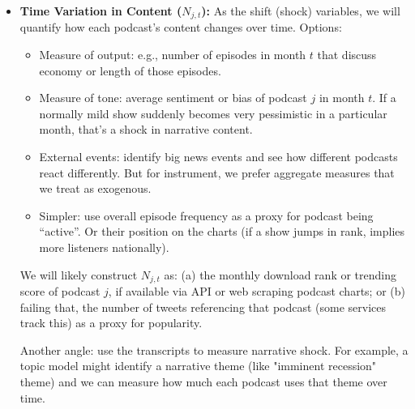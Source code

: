 \documentclass[12pt]{article}
\begin{document}
\begin{itemize}
\begin{itemize}
              \item \textit{Regional media surveys:} Sometimes Pew or others report what \% of each region listens to podcasts, though not show-specific.
              \item A simpler assumption: use demographic info. Many podcasts target known demographics (e.g., some shows have younger urban audiences, others older rural). If detailed data is unavailable, we might define share proxies based on demographic similarity. But this is less ideal.
          \end{itemize}
          We will likely proceed with Google Trends as a feasible route. For each of our candidate podcasts, we obtain a relative popularity index for, say, the top DMA (Designated Market Area) or state. This gives a matrix of popularity. We then normalize each region's shares to sum to 1 across podcasts (or at least relative).

          Note: Google Trends gives relative interest, not absolute. We might need to calibrate such that $\sum_j \text{Share}_{r,j} =$ fraction of people who listen to those podcasts. If 40\% of US adults listen to podcasts monthly (approx), and of those maybe 20\% are news/politics, we can scale accordingly. This isn't crucial for regression (scaling doesn't affect IV consistency), but for interpretation of how many are treated, it helps.

    \item \textbf{Time Variation in Content ($N_{j,t}$):} As the shift (shock) variables, we will quantify how each podcast's content changes over time. Options:
          \begin{itemize}
              \item Measure of output: e.g., number of episodes in month $t$ that discuss economy or length of those episodes.
              \item Measure of tone: average sentiment or bias of podcast $j$ in month $t$. If a normally mild show suddenly becomes very pessimistic in a particular month, that's a shock in narrative content.
              \item External events: identify big news events and see how different podcasts react differently. But for instrument, we prefer aggregate measures that we treat as exogenous.
              \item Simpler: use overall episode frequency as a proxy for podcast being ``active''. Or their position on the charts (if a show jumps in rank, implies more listeners nationally).
          \end{itemize}
          We will likely construct $N_{j,t}$ as: (a) the monthly download rank or trending score of podcast $j$, if available via API or web scraping podcast charts; or (b) failing that, the number of tweets referencing that podcast (some services track this) as a proxy for popularity.

          Another angle: use the transcripts to measure narrative shock. For example, a topic model might identify a narrative theme (like "imminent recession" theme) and we can measure how much each podcast uses that theme over time.
\end{itemize}
\end{document}
